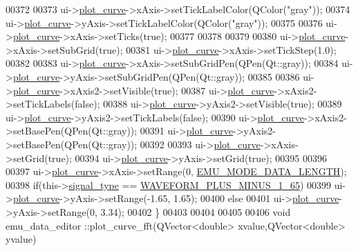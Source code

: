 \begin{DoxyCode}
00372 
00373   ui->\hyperlink{a00079_a1d46308dee8db7e3c99af65f13055479}{plot\_curve}->xAxis->setTickLabelColor(QColor(\textcolor{stringliteral}{"gray"}));
00374   ui->\hyperlink{a00079_a1d46308dee8db7e3c99af65f13055479}{plot\_curve}->yAxis->setTickLabelColor(QColor(\textcolor{stringliteral}{"gray"}));
00375 
00376   ui->\hyperlink{a00079_a1d46308dee8db7e3c99af65f13055479}{plot\_curve}->xAxis->setTicks(\textcolor{keyword}{true});
00377 
00378 
00379 
00380   ui->\hyperlink{a00079_a1d46308dee8db7e3c99af65f13055479}{plot\_curve}->xAxis->setSubGrid(\textcolor{keyword}{true});
00381   ui->\hyperlink{a00079_a1d46308dee8db7e3c99af65f13055479}{plot\_curve}->xAxis->setTickStep(1.0);
00382 
00383   ui->\hyperlink{a00079_a1d46308dee8db7e3c99af65f13055479}{plot\_curve}->xAxis->setSubGridPen(QPen(Qt::gray));
00384   ui->\hyperlink{a00079_a1d46308dee8db7e3c99af65f13055479}{plot\_curve}->yAxis->setSubGridPen(QPen(Qt::gray));
00385 
00386   ui->\hyperlink{a00079_a1d46308dee8db7e3c99af65f13055479}{plot\_curve}->xAxis2->setVisible(\textcolor{keyword}{true});
00387   ui->\hyperlink{a00079_a1d46308dee8db7e3c99af65f13055479}{plot\_curve}->xAxis2->setTickLabels(\textcolor{keyword}{false});
00388   ui->\hyperlink{a00079_a1d46308dee8db7e3c99af65f13055479}{plot\_curve}->yAxis2->setVisible(\textcolor{keyword}{true});
00389   ui->\hyperlink{a00079_a1d46308dee8db7e3c99af65f13055479}{plot\_curve}->yAxis2->setTickLabels(\textcolor{keyword}{false});
00390   ui->\hyperlink{a00079_a1d46308dee8db7e3c99af65f13055479}{plot\_curve}->xAxis2->setBasePen(QPen(Qt::gray));
00391   ui->\hyperlink{a00079_a1d46308dee8db7e3c99af65f13055479}{plot\_curve}->yAxis2->setBasePen(QPen(Qt::gray));
00392 
00393    ui->\hyperlink{a00079_a1d46308dee8db7e3c99af65f13055479}{plot\_curve}->xAxis->setGrid(\textcolor{keyword}{true});
00394    ui->\hyperlink{a00079_a1d46308dee8db7e3c99af65f13055479}{plot\_curve}->yAxis->setGrid(\textcolor{keyword}{true});
00395 
00396 
00397   ui->\hyperlink{a00079_a1d46308dee8db7e3c99af65f13055479}{plot\_curve}->xAxis->setRange(0, \hyperlink{a00006_af4c3a8ad94feb4d7bda7f107f34baf41}{EMU\_MODE\_DATA\_LENGTH});
00398   \textcolor{keywordflow}{if}(this->\hyperlink{a00008_a070edaec5aee6ba1f5a6866bc32c8ce4}{signal\_type} == \hyperlink{a00090_a0923d3b365a36e1e8c401cec964aa36f}{WAVEFORM\_PLUS\_MINUS\_1\_65})
00399   ui->\hyperlink{a00079_a1d46308dee8db7e3c99af65f13055479}{plot\_curve}->yAxis->setRange(-1.65, 1.65);
00400   \textcolor{keywordflow}{else}
00401   ui->\hyperlink{a00079_a1d46308dee8db7e3c99af65f13055479}{plot\_curve}->yAxis->setRange(0, 3.34);
00402 \}
00403 
00404 
00405 
00406 \textcolor{keywordtype}{void} emu\_data\_editor ::plot\_curve\_fft(QVector<double> xvalue,QVector<double> yvalue)

\end{DoxyCode}
